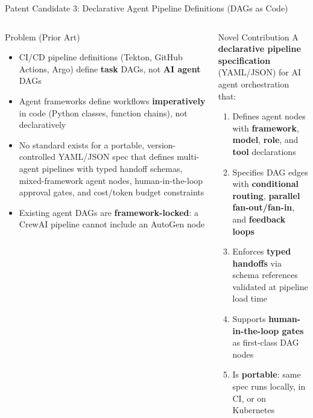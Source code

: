 \begin{frame}{\fontsize{8}{10}\selectfont Patent Candidate 3: Declarative Agent Pipeline Definitions (DAGs as Code)}
  \vspace{-0.3cm}

  \fontsize{5.5}{6.5}\selectfont
  \begin{columns}[T]
    \begin{alertblock}{\fontsize{5.5}{6.5}\selectfont Problem (Prior Art)}
      \fontsize{5.5}{6.5}\selectfont
      \begin{itemize}
        \setlength{\itemsep}{0pt}
        \item CI/CD pipeline definitions (Tekton, GitHub Actions, Argo) define
              \textbf{task} DAGs, not \textbf{AI agent} DAGs
        \item Agent frameworks define workflows \textbf{imperatively} in code
              (Python classes, function chains), not declaratively
        \item No standard exists for a portable, version-controlled YAML/JSON
              spec that defines multi-agent pipelines with typed handoff schemas,
              mixed-framework agent nodes, human-in-the-loop approval gates,
              and cost/token budget constraints
        \item Existing agent DAGs are \textbf{framework-locked}: a CrewAI
              pipeline cannot include an AutoGen node
      \end{itemize}
    \end{alertblock}

    \begin{block}{\fontsize{5.5}{6.5}\selectfont Novel Contribution}
      \fontsize{5.5}{6.5}\selectfont
      A \textbf{declarative pipeline specification} (YAML/JSON) for AI agent
      orchestration that:
      \begin{enumerate}
        \setlength{\itemsep}{0pt}
        \item Defines agent nodes with \textbf{framework}, \textbf{model},
              \textbf{role}, and \textbf{tool} declarations
        \item Specifies DAG edges with \textbf{conditional routing},
              \textbf{parallel fan-out/fan-in}, and \textbf{feedback loops}
        \item Enforces \textbf{typed handoffs} via schema references validated
              at pipeline load time
        \item Supports \textbf{human-in-the-loop gates} as first-class DAG nodes
        \item Is \textbf{portable}: same spec runs locally, in CI, or on
              Kubernetes
      \end{enumerate}
    \end{block}


\end{columns}
\end{frame}
